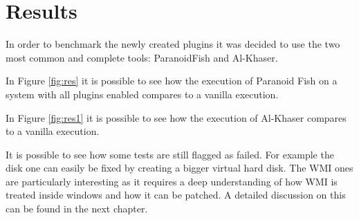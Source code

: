 \section{Results}

In order to benchmark the newly created plugins it was decided to use the two most common and complete tools: ParanoidFish and Al-Khaser.

In Figure \ref{fig:res} it is possible to see how the execution of Paranoid Fish on a system with all plugins enabled compares to a vanilla execution. 

In Figure \ref{fig:res1} it is possible to see how the execution of Al-Khaser compares to a vanilla execution. 


It is possible to see how some tests are still flagged as failed. For example the disk one can easily be fixed by creating a bigger virtual hard disk. The WMI ones are particularly interesting as it requires a deep understanding of how WMI is treated inside windows and how it can be patched. A detailed discussion on this can be found in the next chapter. 

